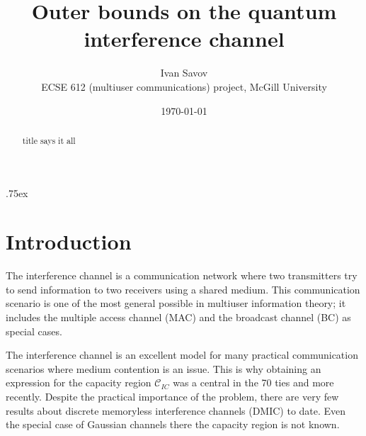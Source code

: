 \documentclass[aps,11pt,twoside,letterpaper]{article}
\theoremstyle{plain}
\theoremstyle{definition}
\newcommand{\ICcap}{  \ensuremath{\mathcal C}_{IC} }
\begin{document}
\title{{\Large Outer bounds on the quantum interference channel} }
\date{\today} 
\author{Ivan Savov \\
    ECSE 612 (multiuser communications) project, McGill University}




\parskip .75ex             %
\maketitle

\begin{abstract}
    title says it all
\end{abstract}


\section{Introduction}


    The interference channel is a communication network where two transmitters try to send
    information to two receivers using a shared medium. 
    This communication scenario is one of the most general possible in multiuser information
    theory; it includes the multiple access channel (MAC) and the broadcast channel (BC)
    as special cases.
    
    The interference channel is an excellent model for many practical communication scenarios
    where medium contention is an issue. This is why obtaining an expression for the capacity region
    $\ICcap$ was a central in the 70 ties and more recently.
    Despite the practical importance of the problem, there are very few results about 
    discrete memoryless interference channels (DMIC) to date.
    Even the special case of Gaussian channels there the capacity region is not known.
    
\end{document}
